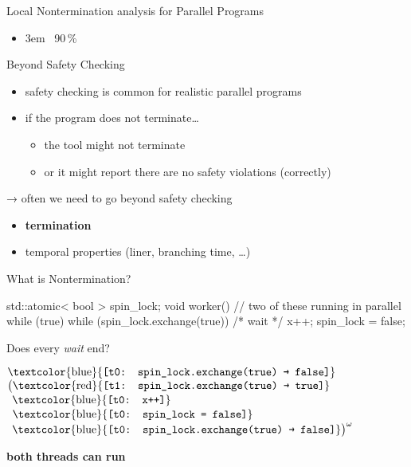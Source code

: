 \documentclass[aspectratio=169, fi]{paradise-slide}
\newcommand{\fcite}[1]{\emergencystretch 3em{\protect\NoHyper\cite{#1}}~\fullcite{#1}}
\newenvironment{prespart}[1]{%
  \begin{frame}{}%
    \centering
      {\Large #1} \par\bigskip\bigskip%
}{%
  \end{frame}%
}
\begin{document}
\begin{prespart}{Local Nontermination analysis for Parallel Programs}
  \begin{itemize}
    \item \fcite{SB2019} \hfill 90\,\%
  \end{itemize}
\end{prespart}

\begin{frame}{Beyond Safety Checking}
  \begin{itemize}
    \item safety checking is common for realistic parallel programs
    \item if the program does not terminate…
    \begin{itemize}
      \item the tool might not terminate
      \item or it might report there are no safety violations (correctly)
    \end{itemize}
  \end{itemize}

  \pause\bigskip
  → often we need to go beyond safety checking
  \begin{itemize}
    \item \textbf{termination}
    \item temporal properties (liner, branching time, …)
  \end{itemize}
\end{frame}

\begin{frame}[fragile]{What is Nontermination?}
  \begin{cppcode}
  std::atomic< bool > spin_lock;
  void worker() { // two of these running in parallel
      while (true) {
          while (spin_lock.exchange(true)) { /* wait */ }
          x++;
          spin_lock = false;
      }
  }
  \end{cppcode}

  Does every \emph{wait} end? \pause

  \bigskip
  \newcommand{\ta}[1]{\text{\textcolor{blue}{\texttt{[t0: #1]}}}}
  \newcommand{\tb}[1]{\text{\textcolor{red}{\texttt{[t1: #1]}}}}
  $\ta{spin\_lock.exchange(true) \textrightarrow{} false}$\\
  $\big(\tb{spin\_lock.exchange(true) \textrightarrow{} true}$\\
  $\phantom{\big(}\ta{x++}$\\
  $\phantom{\big(}\ta{spin\_lock = false}$\\
  $\phantom{\big(}\ta{spin\_lock.exchange(true) \textrightarrow{} false}\big)^\omega$

  \medskip
  \textbf{both threads can run}
\end{frame}
\end{document}
